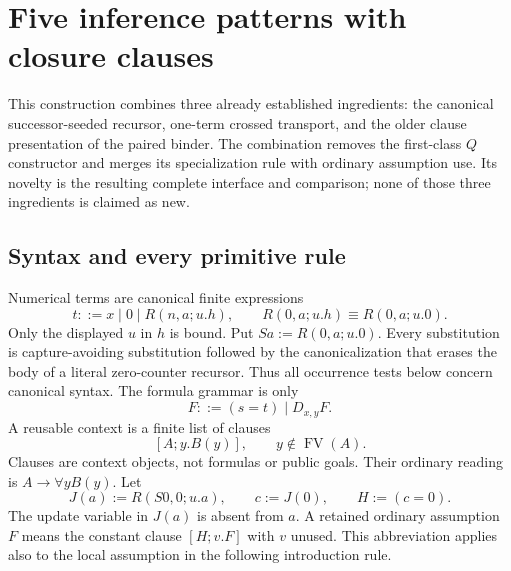\section{Five inference patterns with closure clauses}
\label{sec:clause-five}

This construction combines three already established ingredients: the
canonical successor-seeded recursor, one-term crossed transport, and the
older clause presentation of the paired binder. The combination removes
the first-class $Q$ constructor and merges its specialization rule with
ordinary assumption use. Its novelty is the resulting complete interface
and comparison; none of those three ingredients is claimed as new.

\subsection{Syntax and every primitive rule}

Numerical terms are canonical finite expressions
\[
 t::=x\mid0\mid R(n,a;u.h),\qquad
 R(0,a;u.h)\equiv R(0,a;u.0).
\]
Only the displayed $u$ in $h$ is bound. Put
$Sa:=R(0,a;u.0)$. Every substitution is capture-avoiding substitution
followed by the canonicalization that erases the body of a literal
zero-counter recursor. Thus all occurrence tests below concern canonical
syntax. The formula grammar is only
\[
 F::=(s=t)\mid D_{x,y}F.
\]
A reusable context is a finite list of clauses
\[
 [A;y.B(y)],\qquad y\notin\operatorname{FV}(A).
\]
Clauses are context objects, not formulas or public goals. Their ordinary
reading is $A\to\forall yB(y)$. Let
\[
 J(a):=R(S0,0;u.a),\qquad c:=J(0),\qquad H:=(c=0).
\]
The update variable in $J(a)$ is absent from $a$. A retained ordinary
assumption $F$ means the constant clause $[H;v.F]$ with $v$ unused.
This abbreviation applies also to the local assumption in the following
introduction rule.

